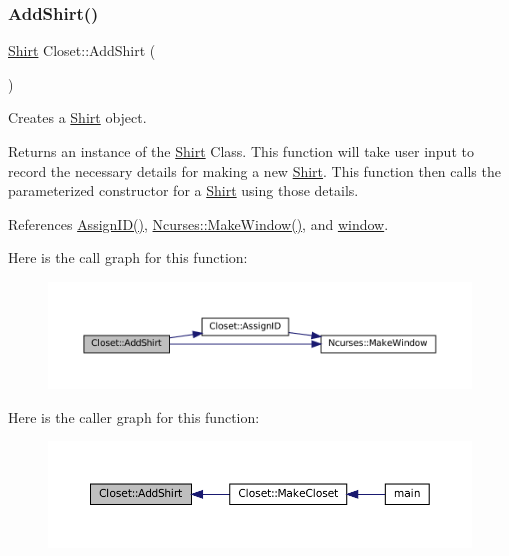 \subsubsection{\texorpdfstring{Add\+Shirt()}{AddShirt()}}
{\footnotesize\ttfamily \mbox{\hyperlink{classShirt}{Shirt}} Closet\+::\+Add\+Shirt (\begin{DoxyParamCaption}{ }\end{DoxyParamCaption})\hspace{0.3cm}{\ttfamily [private]}}



Creates a \textquotesingle{}\mbox{\hyperlink{classShirt}{Shirt}}\textquotesingle{} object. 

\begin{DoxyReturn}{Returns}
an instance of the \textquotesingle{}\mbox{\hyperlink{classShirt}{Shirt}}\textquotesingle{} Class.  This function will take user input to record the necessary details for making a new \textquotesingle{}\mbox{\hyperlink{classShirt}{Shirt}}\textquotesingle{}. This function then calls the parameterized constructor for a \textquotesingle{}\mbox{\hyperlink{classShirt}{Shirt}}\textquotesingle{} using those details. 
\end{DoxyReturn}


References \mbox{\hyperlink{classCloset_afabc27d621abdf0089a6b3027ea8f470}{Assign\+I\+D()}}, \mbox{\hyperlink{classNcurses_a1d8def11419a444c5696b5043da680d4}{Ncurses\+::\+Make\+Window()}}, and \mbox{\hyperlink{classCloset_af1eb4f786cc4eccd3018b90632236a93}{window}}.

Here is the call graph for this function\+:\nopagebreak
\begin{figure}[H]
\begin{center}
\leavevmode
\includegraphics[width=350pt]{classCloset_aba3296cf8964b43f64911cc69c56cbfd_cgraph}
\end{center}
\end{figure}
Here is the caller graph for this function\+:\nopagebreak
\begin{figure}[H]
\begin{center}
\leavevmode
\includegraphics[width=350pt]{classCloset_aba3296cf8964b43f64911cc69c56cbfd_icgraph}
\end{center}
\end{figure}
\mbox{\label{classCloset_a489badac5a919460e8cc8e216f8b3eac}} 
